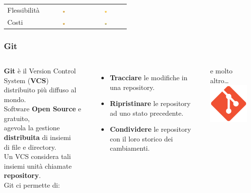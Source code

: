 \documentclass{beamer}
\begin{document}
\begin{frame}
\begin{longtable}{@{}lcc@{}}
		Flessibilità & \includegraphics[width=0.05\textwidth]{joy2.png} & \includegraphics[width=0.05\textwidth]{sad.png}       \\
		Costi        & \includegraphics[width=0.05\textwidth]{joy2.png}         & \includegraphics[width=0.05\textwidth]{sad2.png} \\* \bottomrule
	\end{longtable}
\end{frame}

\begin{frame}
	\frametitle{Git}
	\begin{columns}[T]
		\textbf{Git} è il Version Control System (\textbf{VCS}) \\
		distribuito più diffuso al mondo. \\
		Software \textbf{Open Source} e gratuito,\\ agevola la gestione \textbf{distribuita} di insiemi\\di file e directory. \\
		Un VCS considera tali insiemi unità chiamate \textbf{repository}.\\
		Git ci permette di:
		\begin{itemize}
			\item \textbf{Tracciare} le modifiche in una repository.
			\item \textbf{Ripristinare} le repository ad uno stato precedente.
			\item \textbf{Condividere} le repository con il loro storico dei cambiamenti.
		\end{itemize}
		e molto altro\dots
		\hspace*{-2cm}
		\includegraphics[width=2cm]{figures/git.png}
	\end{columns}

\end{frame}
\end{document}
